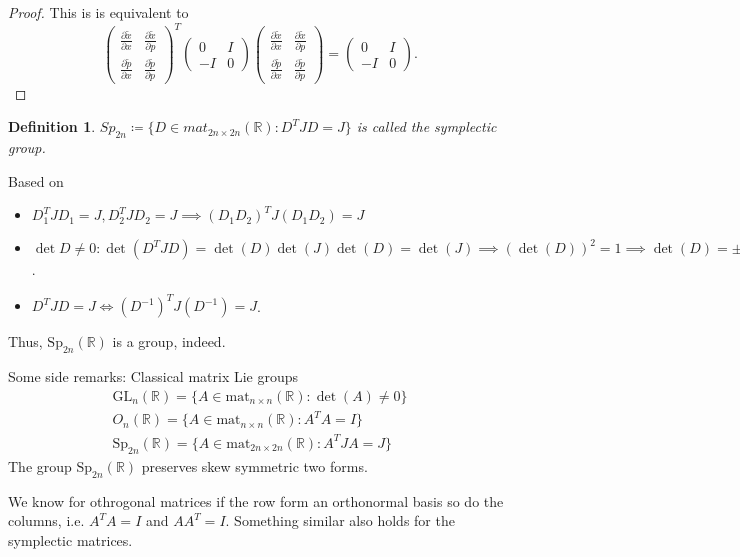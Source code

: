 \documentclass[a4paper, 11pt]{article}
\newtheorem{definition}[theorem]{Definition}
\begin{document}
\begin{proof}
		This is is equivalent to
		\[
			\begin{pmatrix}
				\frac{\partial \tilde x}{\partial x} & \frac{\partial \tilde x}{\partial p} \\
				\frac{\partial \tilde p}{\partial x} & \frac{\partial \tilde p}{\partial p}
			\end{pmatrix}^T \begin{pmatrix}
				0 & I \\ -I & 0
			\end{pmatrix} \begin{pmatrix}
			\frac{\partial \tilde x}{\partial x} & \frac{\partial \tilde x}{\partial p} \\
			\frac{\partial \tilde p}{\partial x} & \frac{\partial \tilde p}{\partial p}
			\end{pmatrix} = \begin{pmatrix}
			0 & I \\ -I & 0
			\end{pmatrix}.
		\]
\end{proof}
\begin{definition}
	$Sp_{2n} \coloneqq \{ D \in mat_{2n \times 2n} (\mathbb R): D^TJD = J \}$ is called the symplectic group.
\end{definition}

Based on 
\begin{itemize}
	\item $D_1^TJD_1 = J, D_2^TJD_2 = J \implies (D_1D_2)^T J (D_1D_2) = J$ 
	\item $\det D \neq 0: \det(D^TJD) = \det(D)\det(J)\det(D) = \det(J) \implies (\det(D))^2 = 1 \implies \det(D) = \pm1$.
	\item $D^TJD = J \iff (D^{-1})^TJ(D^{-1}) = J$.
\end{itemize} 
Thus, $\mathrm{Sp}_{2n}(\mathbb R)$ is a group, indeed.

Some side remarks: Classical matrix Lie groups
\begin{gather*}
	\mathrm{GL}_n(\mathbb R) = \{ A \in \mathrm{mat}_{n \times n}(\mathbb R) : \det(A) \neq 0 \} \\
	O_n(\mathbb R) = \{ A \in \mathrm{mat}_{n \times n}(\mathbb R): A^T A = I \} \\
	\mathrm{Sp}_{2n}(\mathbb R) = \{ A \in \mathrm{mat}_{2n \times 2n}(\mathbb R): A^TJA = J \}
\end{gather*}
The group $\mathrm{Sp}_{2n}(\mathbb R)$ preserves skew symmetric two forms.

We know for othrogonal matrices if the row form an orthonormal basis so do the columns, i.e. $A^T A = I$ and $AA^T = I$. Something similar also holds for the symplectic matrices.
\end{document}

